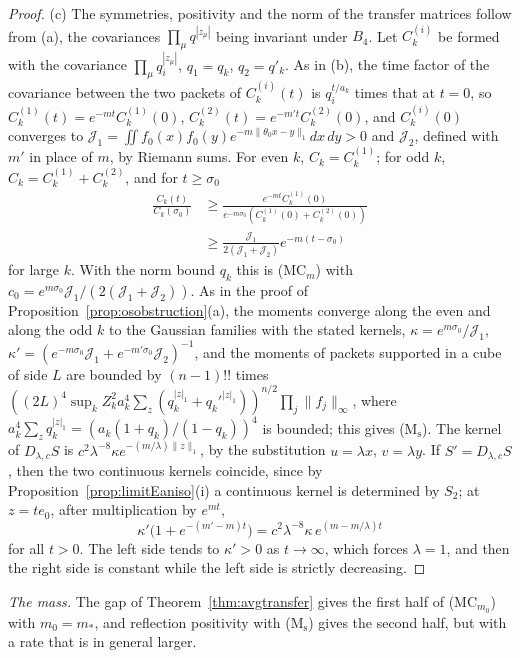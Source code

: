 \documentclass[aps,prd,twocolumn,superscriptaddress,nofootinbib,longbibliography,floatfix,amsmath,amssymb,10pt]{revtex4-2}
\theoremstyle{definition}
\theoremstyle{remark}
\begin{document}
\begin{proof}
(c) The symmetries, positivity and the norm of the transfer matrices follow
from (a), the covariances $\prod_\mu q^{|z_\mu|}$ being invariant under
$B_4$. Let $C^{(i)}_k$ be formed with the covariance $\prod_\mu
q_i^{|z_\mu|}$, $q_1=q_k$, $q_2=q'_k$. As in (b), the time factor of the
covariance between the two packets of $C^{(i)}_k(t)$ is $q_i^{t/a_k}$ times
that at $t=0$, so $C^{(1)}_k(t)=e^{-mt}C^{(1)}_k(0)$, $C^{(2)}_k(t)=
e^{-m't}C^{(2)}_k(0)$, and $C^{(i)}_k(0)$ converges to
$\mathcal J_1=\iint f_0(x)f_0(y)e^{-m\|\theta_0x-y\|_1}dx\,dy>0$ and
$\mathcal J_2$, defined with $m'$ in place of $m$, by Riemann sums. For even $k$, $C_k=C^{(1)}_k$; for odd $k$,
$C_k=C^{(1)}_k+C^{(2)}_k$, and for $t\ge\sigma_0$
\[
\begin{split}
\frac{C_k(t)}{C_k(\sigma_0)}&\ge\frac{e^{-mt}C^{(1)}_k(0)}{e^{-m\sigma_0}
(C^{(1)}_k(0)+C^{(2)}_k(0))}\\
&\ge\frac{\mathcal J_1}{2(\mathcal J_1+\mathcal J_2)}e^{-m(t-\sigma_0)}
\end{split}
\]
for large $k$. With the norm bound $q_k$ this is (MC$_m$) with $c_0=
e^{m\sigma_0}\mathcal J_1/(2(\mathcal J_1+\mathcal J_2))$. As in the proof
of Proposition~\ref{prop:osobstruction}(a), the moments converge along the
even and along the odd $k$ to the Gaussian families with the stated
kernels, $\kappa=e^{m\sigma_0}/\mathcal J_1$, $\kappa'=(e^{-m\sigma_0}
\mathcal J_1+e^{-m'\sigma_0}\mathcal J_2)^{-1}$, and the moments of
packets supported in a cube of side $L$ are bounded by $(n-1)!!$ times
$((2L)^4\sup_kZ_k^2a_k^4\sum_z(q_k^{|z|_1}+q_k'^{|z|_1}))^{n/2}\prod_j\|f_j
\|_\infty$, where $a_k^4\sum_zq_k^{|z|_1}=(a_k(1+q_k)/(1-q_k))^4$ is bounded;
this gives (M$_{\mathrm s}$). The kernel of $D_{\lambda,c}S$ is $c^2
\lambda^{-8}\kappa e^{-(m/\lambda)\|z\|_1}$, by the substitution $u=\lambda
x$, $v=\lambda y$. If $S'=D_{\lambda,c}S$, then the two continuous kernels
coincide, since by Proposition~\ref{prop:limitEaniso}(i) a continuous kernel
is determined by $S_2$; at $z=te_0$, after multiplication by $e^{mt}$,
\[
\kappa'\bigl(1+e^{-(m'-m)t}\bigr)=c^2\lambda^{-8}\kappa\,e^{(m-m/\lambda)t}
\]
for all $t>0$. The left side tends to $\kappa'>0$ as $t\to\infty$, which
forces $\lambda=1$, and then the right side is constant while the left side
is strictly decreasing.
\end{proof}

\emph{The mass.} The gap of Theorem~\ref{thm:avgtransfer} gives the first
half of (MC$_{m_0}$) with $m_0=m_*$, and reflection positivity with
(M$_{\mathrm s}$) gives the second half, but with a rate that is in general
larger.
\end{document}

